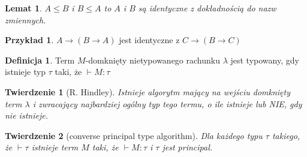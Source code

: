 \documentclass[10pt,a4paper]{article}
\theoremstyle{plain}
\newtheorem{theorem}{Twierdzenie}
\newtheorem{lemma}{Lemat}
\theoremstyle{definition}
\newtheorem*{definition}{Definicja}
\newtheorem*{example}{Przykład}
\begin{document}
\begin{lemma}
$A \leq B$ i $B \leq A$ to $A$ i $B$ są identyczne z dokładnością do nazw zmiennych.
\end{lemma}


\begin{example}
$A \rightarrow (B \rightarrow A)$ jest identyczne z $C \rightarrow (B \rightarrow C)$
\end{example}

\begin{definition}
Term $M$-domknięty nietypowanego rachunku $\lambda$ jest typowany, gdy istnieje typ $\tau$ taki, że $\vdash M:\tau$
\end{definition}


\begin{theorem}[R. Hindley]
Istnieje algorytm mający na wejściu domknięty term $\lambda$ i zwracający najbardziej ogólny typ tego termu, o ile istnieje lub NIE, gdy nie istnieje.
\end{theorem}

\begin{theorem}[converse principal type algorithm]
Dla każdego typu $\tau$ takiego, że $\vdash \tau$ istnieje term $M$ taki, że $\vdash M:\tau$ i $\tau$ jest principal.
\end{theorem}
\end{document}
